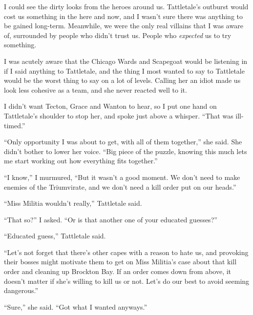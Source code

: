 





I could see the dirty looks from the heroes around us.  Tattletale's outburst would cost us something in the here and now, and I wasn't sure there was anything to be gained long-term.  Meanwhile, we were the only real villains that I was aware of, surrounded by people who didn't trust us.  People who \emph{expected} us to try something.



I was acutely aware that the Chicago Wards and Scapegoat would be listening in if I said anything to Tattletale, and the thing I most wanted to say to Tattletale would be the worst thing to say on a lot of levels.  Calling her an idiot made us look less cohesive as a team, and she never reacted well to it.



I didn't want Tecton, Grace and Wanton to hear, so I put one hand on Tattletale's shoulder to stop her, and spoke just above a whisper.  ``That was ill-timed.''



``Only opportunity I was about to get, with all of them together,'' she said.  She didn't bother to lower her voice.  ``Big piece of the puzzle, knowing this much lets me start working out how everything fits together.''



``I know,'' I murmured, ``But it wasn't a good moment.  We don't need to make enemies of the Triumvirate, and we don't need a kill order put on our heads.''



``Miss Militia wouldn't really,'' Tattletale said.



``That so?'' I asked.  ``Or is that another one of your educated guesses?''



``Educated guess,'' Tattletale said.



``Let's not forget that there's other capes with a reason to hate us, and provoking their bosses might motivate them to get on Miss Militia's case about that kill order and cleaning up Brockton Bay.  If an order comes down from above, it doesn't matter if she's willing to kill us or not.  Let's do our best to avoid seeming dangerous.''



``Sure,'' she said.  ``Got what I wanted anyways.''



